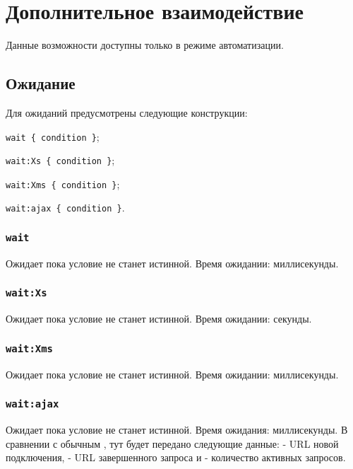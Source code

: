 \section{Дополнительное взаимодействие}

Данные возможности доступны только в режиме автоматизации.

\subsection{Ожидание}

Для ожиданий предусмотрены следующие конструкции:
\begin{icItems}
	\item \lstinline|wait { condition }|;
	\item \lstinline|wait:Xs { condition }|;
	\item \lstinline|wait:Xms { condition }|;
	\item \lstinline|wait:ajax { condition }|.
\end{icItems}

\subsubsection{\lstinline|wait|}

Ожидает пока условие не станет истинной. Время ожидании:  миллисекунды. 

\subsubsection{\lstinline|wait:Xs|}

Ожидает пока условие не станет истинной. Время ожидании:  секунды. 

\subsubsection{\lstinline|wait:Xms|}

Ожидает пока условие не станет истинной. Время ожидании:  миллисекунды. 

\subsubsection{\lstinline|wait:ajax|}

Ожидает пока условие не станет истинной. Время ожидания:  миллисекунды. В сравнении с обычным , тут будет передано следующие данные:  - URL новой подключения,  - URL завершенного запроса и  - количество активных запросов.

